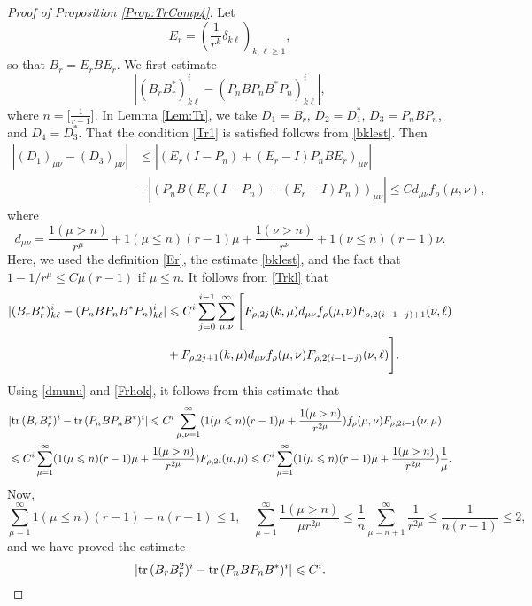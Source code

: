 \documentclass{article}
\numberwithin{equation}{section}
\numberwithin{figure}{section}
\theoremstyle{plain}
\theoremstyle{plain}
\numberwithin{thm}{section}
\theoremstyle{remark}
\newcommand{\Tr}{\text{{\rm tr\,}}}
\let \le \leqslant
\let \ge \geqslant
\begin{document}
\begin{proof}[Proof of Proposition \ref{Prop:TrComp4}]
Let
\begin{equation}\label{Er}
E_r=\left(\frac 1{r^k}\delta_{k\ell}\right)_{k,\ell\ge 1},
\end{equation}
so that $B_r=E_rBE_r$. We first estimate
\begin{equation*}
    |(B_rB_r^*)^i_{k\ell}-(P_nBP_nB^*P_n)^i_{k\ell}|,
\end{equation*}
where $n=\Big[\frac{1}{r-1}$\Big]. In Lemma \ref{Lem:Tr}, we take $D_1=B_r$, $D_2=D_1^*$, $D_3=P_nBP_n$, and $D_4=D_3^*$. That the condition \eqref{Tr1} is satisfied follows from \eqref{bklest}. Then
\begin{align*}
    |(D_1)_{\mu\nu}-(D_3)_{\mu\nu}|&\le |(E_r(I-P_n)+(E_r-I)P_nBE_r)_{\mu\nu}|\\
    &+|(P_nB(E_r(I-P_n)+(E_r-I)P_n))_{\mu\nu}|\le Cd_{\mu\nu}f_\rho(\mu,\nu),
\end{align*}
where
\begin{equation}\label{dmunu}
    d_{\mu\nu}=\frac{1(\mu>n)}{r^\mu}+1(\mu\le n)(r-1)\mu+\frac{1(\nu>n)}{r^\nu}+1(\nu\le n)(r-1)\nu.
\end{equation}
Here, we used the definition \eqref{Er}, the estimate \eqref{bklest}, and the fact that $1-1/r^\mu\le C\mu(r-1)$ if $\mu\le n$. It follows from \eqref{Trkl} that
\begin{align}\label{BrBPnstep}
|(B_rB_r^*)^i_{k\ell}-(P_nBP_nB^*P_n)^i_{k\ell}|&\le C^i\sum_{j=0}^{i-1}\sum_{\mu,\nu}^\infty\Bigg[F_{\rho,2j}(k,\mu)d_{\mu\nu}f_\rho(\mu,\nu)F_{\rho,2(i-1-j)+1}(\nu,\ell)\notag\\
&+F_{\rho,2j+1}(k,\mu)d_{\mu\nu}f_\rho(\mu,\nu)F_{\rho,2(i-1-j)}(\nu,\ell)\Bigg].   
\end{align}
Using \eqref{dmunu} and \eqref{Frhok}, it follows from this estimate that
\begin{align*}
&|\Tr(B_rB_r^*)^i-\Tr(P_nBP_nB^*)^i|
\le C^i\sum_{\mu,\nu=1}^\infty (1(\mu\le n)(r-1)\mu+\frac{1(\mu>n)}{r^{2\mu}})f_\rho(\mu,\nu)F_{\rho,2i-1}(\nu,\mu)\\
&\le C^i\sum_{\mu=1}^\infty (1(\mu\le n)(r-1)\mu+\frac{1(\mu>n)}{r^{2\mu}})F_{\rho,2i}(\mu,\mu)
\le C^i\sum_{\mu=1}^\infty (1(\mu\le n)(r-1)\mu+\frac{1(\mu>n)}{r^{2\mu}})\frac 1\mu.
\end{align*}
Now,
\begin{equation*}
\sum_{\mu=1}^\infty 1(\mu\le n)(r-1)=n(r-1)\le 1, \quad \sum_{\mu=1}^\infty \frac{1(\mu>n)}{\mu r^{2\mu}}\le \frac 1n\sum_{\mu=n+1}^\infty\frac 1{r^{2\mu}}\le\frac 1{n(r-1)}\le 2,
\end{equation*}
and we have proved the estimate
\begin{equation}\label{Trb1}
|\Tr(B_rB_r^2)^i-\Tr(P_nBP_nB^*)^i|\le C^i.
\end{equation}


\end{proof}
\end{document}
